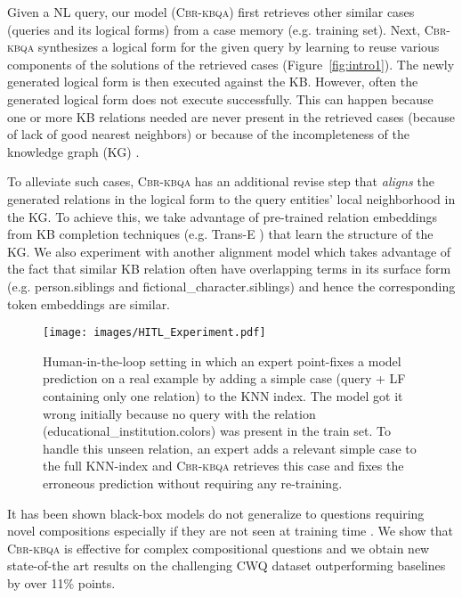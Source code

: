 \documentclass{article}
\newcommand{\alg}{\textsc{Cbr-kbqa}\xspace}
\begin{document}
Given a NL query, our model (\alg) first retrieves other similar cases (queries and its logical forms) from a case memory (e.g. training set). Next, \alg synthesizes a logical form for the given query by learning to reuse various components of the solutions of the retrieved cases (Figure~\ref{fig:intro1}). The newly generated logical form is then executed against the KB. However, often the generated logical form does not execute successfully. This can happen because one or more KB relations needed are never present in the retrieved cases (because of lack of good nearest neighbors) or because of the incompleteness of the knowledge graph (KG) \cite{min2013distant}.

To alleviate such cases, \alg has an additional revise step that \emph{aligns} the generated relations in the logical form to the query entities' local neighborhood in the KG. To achieve this, we take advantage of pre-trained relation embeddings from KB completion techniques (e.g. Trans-E \cite{bordes2013translating}) that learn the structure of the KG. We also experiment with another alignment model which takes advantage of the fact that similar KB relation often have overlapping terms in its surface form (e.g. \textsf{person.siblings} and \textsf{fictional\_character.siblings}) and hence the corresponding token embeddings are similar. 


\begin{figure}
    \centering
    \vspace{-3mm}
    \texttt{[image: images/HITL\_Experiment.pdf]}
    \vspace{-5mm}
    \caption{Human-in-the-loop setting in which an expert point-fixes a model prediction on a real example by adding a simple case (query + LF containing only one relation) to the KNN index. The model got it wrong initially because no query with the relation (educational\_institution.colors) was present in the train set. To handle this unseen relation, an expert adds a relevant simple case to the full KNN-index and \alg retrieves this case and fixes the erroneous prediction without requiring any re-training.}
    \label{fig:hitl_fig}
    \vspace{-3mm}
\end{figure}

It has been shown black-box models do not generalize to questions requiring novel compositions especially if they are not seen at training time \cite{lake_baroni,loula2018rearranging}. We show that \alg is effective for complex compositional questions and we obtain new state-of-the art results on the challenging CWQ dataset \cite{Talmor2018TheWA} outperforming baselines by over 11\% points.
\end{document}
